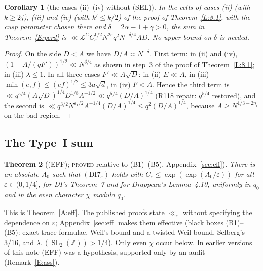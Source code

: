 \documentclass[10pt,reqno]{amsart}
\newtheorem{theorem}{Theorem}[section]
\newtheorem{corollary}[theorem]{Corollary}
\theoremstyle{definition}
\numberwithin{equation}{section}
\newcommand{\Z}{\mathbb Z}
\newcommand{\cL}{\mathcal L}
\DeclareMathOperator{\SL}{SL}
\newcommand{\status}[1]{\textup{\textsc{#1}}}
\begin{document}
\begin{corollary}[the cases (ii)--(iv) without (SEL)]\label{E:cases}
In the cells of cases (ii) (with $k\ge2j$), (iii) and (iv) (with
$k'\le k/2$) of the proof of Theorem~\ref{L:8.1}, with the cusp
parameter chosen there and $\delta=2\alpha-1+\gamma>0$, the sum in
Theorem~\ref{E:perd} is
$\ll\cL^CC_\varepsilon^{1/2}N^{2\varepsilon}q^2N^{-\delta/4}AD$.
No upper bound on $\delta$ is needed.
\end{corollary}
\begin{proof}
On the side $D<A$ we have $D/A\asymp N^{-\delta}$. First term: in (ii)
and (iv), $(1+A/(qF'))^{1/2}\ll N^{\delta/4}$ as shown in step~3 of the
proof of Theorem~\ref{L:8.1}; in (iii) $\lambda\le1$. In all three cases
$F'\ll A\sqrt D$: in (ii) $E\ll A$, in (iii)
$\min(e,f)\le(ef)^{1/2}\le3a\sqrt d$, in (iv) $F<A$. Hence the third term is
$\ll q^{5/4}(A\sqrt D)^{1/4}D^{1/8}A^{-1/2}\ll q^{5/4}(D/A)^{1/4}$ (R118 repair: $q^{5/4}$ restored), and the second is
$\ll q^{3/2}N^{\varepsilon_1/2}A^{-1/4}(D/A)^{1/4}\le q^2(D/A)^{1/4}$,
because $A\ge N^{1/3-2\eta_1}$ on the bad region.
\end{proof}

\subsection*{The Type~I sum}
\begin{theorem}[(EFF); \status{proved} relative to (B1)--(B5), Appendix~\ref{sec:eff}]\label{hyp:eff}
There is an absolute $A_0$ such that $(\mathrm{DI7}_\varepsilon)$ holds with
$C_\varepsilon\le\exp(\exp(A_0/\varepsilon))$ for all $\varepsilon\in(0,1/4]$,
for DI's Theorem~7 and for Drappeau's Lemma~4.10, uniformly in $q_0$ and in
the even character $\chi$ modulo $q_0$.
\end{theorem}
This is Theorem~\ref{A:eff}. The published proofs \cite{DI,Dr} state
$\ll_\varepsilon$ without specifying the dependence on $\varepsilon$;
Appendix~\ref{sec:eff} makes them effective (black boxes (B1)--(B5): exact trace
formulae, Weil's bound and a twisted Weil bound, Selberg's $3/16$, and
$\lambda_1(\SL_2(\Z))>1/4$). Only even $\chi$ occur below. In earlier versions
of this note (EFF) was a hypothesis, supported only by an audit
(Remark~\ref{E:ass}).
\end{document}
